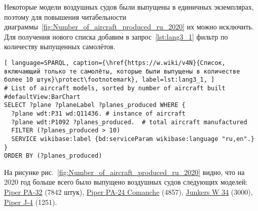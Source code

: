 Некоторые модели воздушных судов были выпущены в единичных экземплярах, поэтому для повышения читабельности диаграммы~\ref{fig:Number_of_aircraft_produced_ru_2020} их можно исключить. Для получения нового списка добавим в запрос~\ref{lst:lang3_1} фильтр по количеству выпущенных самолётов.


\begin{lstlisting}[ language=SPARQL, caption={\href{https://w.wiki/v4N}{Список, включающий только те самолёты, которые были выпущены в количестве более 10 штук}\protect\footnotemark}, label=lst:lang3_1, ]
# List of aircraft models, sorted by number of aircraft built
#defaultView:BarChart
SELECT ?plane ?planeLabel ?planes_produced WHERE {
  ?plane wdt:P31 wd:Q11436. # instance of aircraft
  ?plane wdt:P1092 ?planes_produced.  # total aircraft manufactured
  FILTER (?planes_produced > 10)
  SERVICE wikibase:label {bd:serviceParam wikibase:language "ru,en".}
}
ORDER BY (?planes_produced)
\end{lstlisting}


\label{aircraft_question_2}

На рисунке рис.~\ref{fig:Number_of_aircraft_produced_ru_2020} видно, что на 2020 год больше всего было выпущено воздушных судов следующих моделей: \href{https://www.wikidata.org/wiki/Q2096452}{Piper PA-32} (\num{7842} штук), \href{https://www.wikidata.org/wiki/Q1860367}{Piper PA-24 Comanche} (\num{4857}), \href{https://www.wikidata.org/wiki/Q694521}{Junkers W 34} (\num{3000}), \href{https://www.wikidata.org/wiki/Q4046989}{Piper J-4} (\num{1251}).

